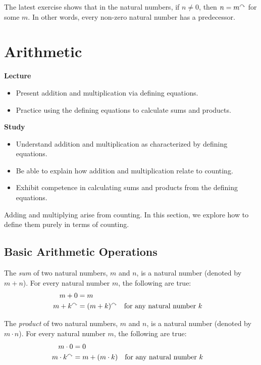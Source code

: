 The latest exercise shows that in the natural numbers, if $n\neq 0$, then $n = m^\curvearrowright$ for some $m$. In other
words, every non-zero natural number has a predecessor. 


\chapter{Arithmetic}\label{lec:Arithmetic}


\begin{goals}
\tightlists
\noindent\textbf{Lecture}
\begin{itemize}
\item Present addition and multiplication via defining equations.
\item Practice using the defining equations to calculate sums and products.
\end{itemize}

\noindent\textbf{Study}
\begin{itemize}
  \item Understand addition and multiplication as characterized by defining equations.
  \item Be able to explain how addition and multiplication relate to counting.
  \item Exhibit competence in calculating sums and products from the defining equations.
\end{itemize}
\end{goals}

Adding and multiplying arise from counting. In this section, we explore how to define them purely in terms of counting.

\ipadbreak

\section{Basic Arithmetic Operations}

\begin{defn}\label{def:NatArithmetic}
\noindent The \emph{sum} of two natural numbers, $m$ and $n$, is a natural number (denoted by $m+n$). For every natural number $m$, the following 
are true:
\begin{align*}
    m + 0     &= m\\
    m + k^\curvearrowright &= (m + k)^\curvearrowright &&\text{for any natural number $k$}
\end{align*}

\noindent The \emph{product} of two natural numbers, $m$ and $n$, is a natural number 
(denoted by $m\cdot n$). For every natural number $m$, the following are true:
\begin{align*}
  m\cdot 0 &= 0\\
  m\cdot k^\curvearrowright &= m + (m\cdot k) &&\text{for any natural number $k$}
\end{align*}
\end{defn}


